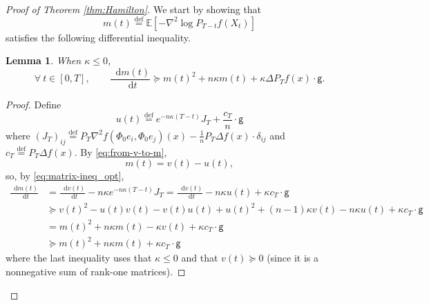 \documentclass[a4paper,twoside,11pt,reqno]{amsart}
\newcommand{\eqdef}{\stackrel{\mathrm{def}}{=}}
\newtheorem{lemma}[theorem]{Lemma}
\newcommand*\diff{\mathop{}\!\mathrm{d}}
\newcommand{\GG}{\mathsf{g}}
\newcommand{\mb}{\mathbb}
\begin{document}
\begin{proof}[Proof of Theorem \ref{thm:Hamilton}]
We start by showing  that 
\begin{equation}\label{eq:m(t)def}
m(t)\eqdef\mb{E}[-\nabla^2\log P_{T-t}f(X_t)]
\end{equation}
satisfies the following differential inequality.
\begin{lemma}
\label{lem:m(t)ODI}
When $\kappa\le 0$,
\begin{equation}\label{eq:m(t)DI}
\forall \ t\in [0,T],\qquad \frac{\diff m(t)}{\diff t}\succeq m(t)^2+n\kappa m(t)+\kappa \Delta P_Tf(x)\cdot \GG.
\end{equation}
\end{lemma}
\begin{proof}
Define
\begin{equation}
\label{eq:u}
u(t)\eqdef e^{-n\kappa(T-t)}J_T+\frac{c_T}{n}\cdot\GG
\end{equation}
where $(J_T)_{ij} \eqdef P_T\nabla^2 f(\Phi_0 e_i, \Phi_0 e_j)(x) - \frac{1}{n} P_T \Delta f(x)\cdot \delta_{ij}$ and $c_T\eqdef P_T\Delta f(x)$. By \eqref{eq:from-v-to-m},
\begin{equation}
\label{eq:mJ_T}
m(t) = v(t) - u(t),
\end{equation}
so, by  \eqref{eq:matrix-ineq_opt},
\begin{align}
\label{eq:mJ_T_partial_t}
\frac{\diff m(t) }{\diff t}&=\frac{\diff v(t) }{\diff t}-n\kappa e^{-n\kappa(T-t)}J_T=\frac{\diff v(t) }{\diff t}-n\kappa u(t)+\kappa c_T\cdot \GG\\
&\succeq v(t)^2- u(t) v(t)  - v(t) u(t)+u(t)^2  + (n-1)\kappa v(t)-n\kappa u(t)+\kappa c_T\cdot \GG\\
&=m(t)^2 + n\kappa m(t)-\kappa v(t)+\kappa c_T\cdot \GG\\
&\succeq m(t)^2 + n\kappa m(t)+\kappa c_T\cdot \GG
\end{align}
where the last inequality uses that $\kappa\le 0$ and that $v(t)\succeq 0$ (since it is a nonnegative sum of rank-one matrices).
\end{proof}


\end{proof}
\end{document}

